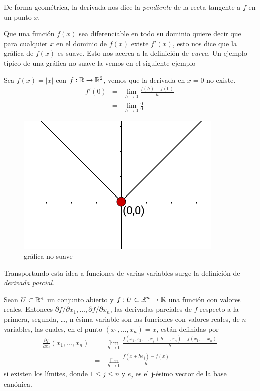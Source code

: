 De forma geométrica, la derivada nos dice la \emph{pendiente} de la recta tangente a $f$ en un punto $x$.

Que una función $f(x)$ sea diferenciable en todo su dominio quiere decir que para cualquier $x$ en el dominio de $f(x)$ existe
$f'(x)$, esto nos dice que la gráfica de $f(x)$ es suave. Esto nos acerca a la definición de \emph{curva}. Un ejemplo típico 
de una gráfica no suave la vemos en el siguiente ejemplo

\begin{myExample}
    Sea $f(x) = |x|$ con $f:\mathbb{R} \rightarrow \mathbb{R}^{2}$, vemos que la derivada en $x=0$ no existe.
    \begin{eqnarray*}
        f'(0) &=& \lim_{h \rightarrow 0} \frac{f(h) - f(0)}{h} \\
              &=& \lim_{h \rightarrow 0} \frac{0}{0}
    \end{eqnarray*}
\end{myExample}

\begin{figure}[!ht]
  \begin{center}
      \includegraphics[width=0.6\linewidth]{gfx/grafica-abs}
      \caption{gráfica no suave}
      \label{fig:boat1}
  \end{center}
\end{figure}

Transportando esta idea a funciones de varias variables surge la definición de \emph{derivada parcial}.

\begin{definition}
    Sean $U \subset \mathbb{R}^{n}$ un conjunto abierto y $f:U \subset \mathbb{R}^{n} \rightarrow \mathbb{R}$ una función con valores reales. Entonces $\partial f/\partial x_{1},
    \ldots, \partial f/ \partial x_{n}$, las derivadas parciales de $f$ respecto a la primera, segunda, \dots, n-ésima variable son las funciones con valores
    reales, de $n$ variables, las cuales, en el punto $(x_{1},\ldots,x_{n}) = x$, están definidas por
    \begin{eqnarray*}
        \frac{\partial f}{\partial x_{j}} (x_{1},\ldots,x_{n}) &=& \lim_{h \rightarrow 0} \frac{f(x_{1},x_{2},\ldots,x_{j} + h,\ldots,x_{n}) - f(x_{1},\ldots,x_{n})}{h} \\
                                                               &=& \lim_{h \rightarrow 0} \frac{f(x+he_{j})-f(x)}{h} 
    \end{eqnarray*}
    si existen los límites, donde $1 \le j \le n$ y $e_{j}$ es el j-ésimo vector de la base canónica.
\end{definition}

